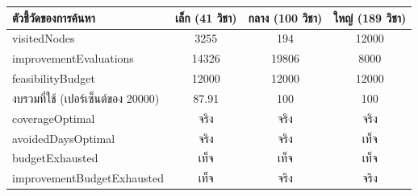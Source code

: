 \begin{center}\begin{minipage}{\textwidth}\centering{}\label{tab:search}{\small\tabcolsep=3pt\begin{tabular}{>{\raggedright\arraybackslash}p{6cm}ccc}\toprule ตัวชี้วัดของการค้นหา & เล็ก (41 วิชา) & กลาง (100 วิชา) & ใหญ่ (189 วิชา) \\\midrule
visitedNodes & 3255 & 194 & 12000 \\
improvementEvaluations & 14326 & 19806 & 8000 \\
feasibilityBudget & 12000 & 12000 & 12000 \\
งบรวมที่ใช้ (เปอร์เซ็นต์ของ 20000) & 87.91 & 100 & 100 \\
coverageOptimal & จริง & จริง & จริง \\
avoidedDaysOptimal & จริง & จริง & เท็จ \\
budgetExhausted & เท็จ & เท็จ & เท็จ \\
improvementBudgetExhausted & เท็จ & จริง & จริง \\
\bottomrule\end{tabular}}\end{minipage}\end{center}
